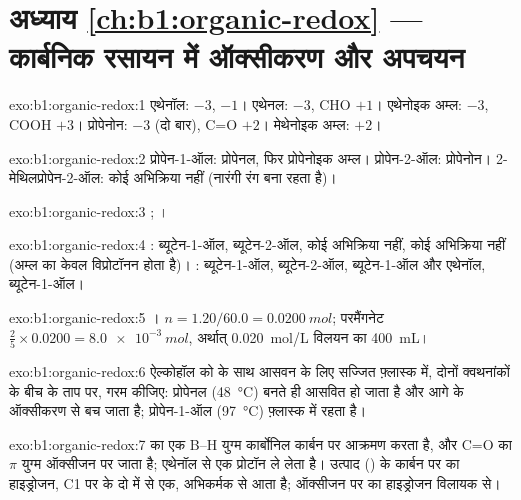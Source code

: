 \section*{अध्याय \ref{ch:b1:organic-redox} --- कार्बनिक रसायन में ऑक्सीकरण और अपचयन}

\begin{solution}{exo:b1:organic-redox:1}
एथेनॉल:  $-3$,  $-1$। एथेनल:  $-3$, CHO $+1$।
एथेनोइक अम्ल:  $-3$, COOH $+3$। प्रोपेनोन:  $-3$ (दो बार),
C=O $+2$। मेथेनोइक अम्ल: $+2$।
\end{solution}

\begin{solution}{exo:b1:organic-redox:2}
प्रोपेन-1-ऑल: प्रोपेनल, फिर प्रोपेनोइक अम्ल। प्रोपेन-2-ऑल: प्रोपेनोन।
2-मेथिलप्रोपेन-2-ऑल: कोई अभिक्रिया नहीं (नारंगी रंग बना रहता है)।
\end{solution}

\begin{solution}{exo:b1:organic-redox:3}
;
।
\end{solution}

\begin{solution}{exo:b1:organic-redox:4}
: ब्यूटेन-1-ऑल, ब्यूटेन-2-ऑल, कोई अभिक्रिया नहीं, कोई अभिक्रिया नहीं (अम्ल का
केवल विप्रोटॉनन होता है)। : ब्यूटेन-1-ऑल, ब्यूटेन-2-ऑल, ब्यूटेन-1-ऑल और
एथेनॉल, ब्यूटेन-1-ऑल।
\end{solution}

\begin{solution}{exo:b1:organic-redox:5}
।
$n = 1.20/60.0 = \qty{0.0200}{mol}$; परमैंगनेट $\frac25 \times 0.0200 =
\qty{8.0e-3}{mol}$, अर्थात् \qty{0.020}{mol/L} विलयन का \qty{400}{mL}।
\end{solution}

\begin{solution}{exo:b1:organic-redox:6}
ऐल्कोहॉल को  के साथ आसवन के लिए सज्जित फ़्लास्क में, दोनों क्वथनांकों के
बीच के ताप पर, गरम कीजिए: प्रोपेनल (\qty{48}{\celsius})
बनते ही आसवित हो जाता है और आगे के ऑक्सीकरण से बच जाता है; प्रोपेन-1-ऑल
(\qty{97}{\celsius}) फ़्लास्क में रहता है।
\end{solution}

\begin{solution}{exo:b1:organic-redox:7}
 का एक B--H युग्म कार्बोनिल कार्बन पर आक्रमण करता है, और C=O का $\pi$ युग्म
ऑक्सीजन पर जाता है;  एथेनॉल से एक प्रोटॉन ले लेता है। उत्पाद
() के कार्बन पर का हाइड्रोजन, C1 पर के दो में से एक, अभिकर्मक से आता है;
ऑक्सीजन पर का हाइड्रोजन विलायक से।
\end{solution}

